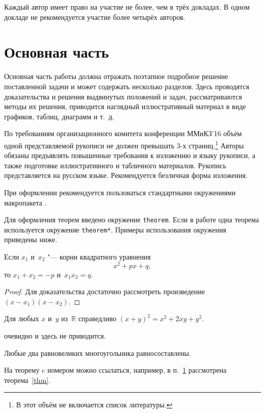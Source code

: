 \documentclass[10pt,twoside,book,a5paper]{ncc}
\begin{document}
Каждый автор имеет право на участие не более, чем в трёх докладах. 
В одном докладе не рекомендуется участие более четырёх авторов.

\section{Основная часть} 
\label{base-section}

Основная часть работы должна отражать поэтапное подробное решение поставленной задачи и может содержать несколько разделов. Здесь проводятся доказательства и решения выдвинутых положений и задач, рассматриваются методы их решения, приводится наглядный иллюстративный материал в виде графиков, таблиц, диаграмм и т.~д.

По требованиям организационного комитета конференции ММиКЗ'16 объём одной представляемой рукописи не должен превышать 3-х страниц.\footnote{В этот объём не включается список литературы.}
Авторы обязаны предъявлять повышенные требования к изложению и языку рукописи, а также подготовке иллюстративного и табличного материалов. 
Рукопись представляется на русском языке. 
Рекомендуется безличная форма изложения.

При оформлении рекомендуется пользоваться стандартными окружениями макропакета \LaTeXe.

Для оформления теорем введено окружение \verb"theorem".
Если в работе одна теорема используется окружение \verb"theorem*".
Примеры использования окружения приведены ниже.

\begin{theorem}[Виета]
Если $x_1$ и~$x_2$ "--- корни квадратного уравнения $$x^2+px+q,$$ то $x_1 + x_2 = -p$ и~$x_1 x_2 = q.$
\end{theorem}
\begin{proof} Для доказательства достаточно рассмотреть произведение $(x-x_1)(x-x_2)$.
\end{proof}

\begin{theorem}
\label{thm}
Для любых $x$ и~$y$ из~$\mathbb R$ справедливо $(x+y)^2 = x^2+2xy+y^2$.
\end{theorem}

\Proof очевидно и здесь не приводится.

\begin{theorem*}
Любые два равновеликих многоугольника равносоставлены.
\end{theorem*}

На теорему c номером можно ссылаться, например, в п.~\ref{base-section} рассмотрена теорема~\ref{thm}.
\end{document}
